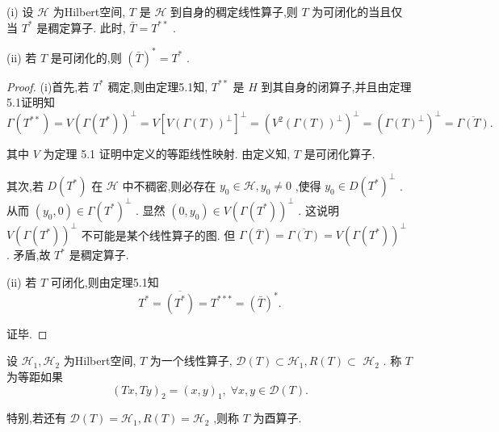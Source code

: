 \documentclass[lang=cn,newtx,10pt,scheme=chinese,thmcnt=chapter]{elegantbook}
\begin{document}
\begin{theorem}
     (i) 设 \(\mathcal{H}\) 为Hilbert空间, \(T\) 是 \(\mathcal{H}\) 到自身的稠定线性算子,则 \(T\) 为可闭化的当且仅当 \({T}^{ * }\) 是稠定算子. 此时, \(\bar{T} = {T}^{* * }\) .

(ii) 若 \(T\) 是可闭化的,则 \({\left( \bar{T}\right) }^{ * } = {T}^{ * }\) .

\end{theorem}
\begin{proof}
    (i)首先,若 \({T}^{ * }\) 稠定,则由定理5.1知, \({T}^{* * }\) 是 \(H\) 到其自身的闭算子,并且由定理5.1证明知
\begin{equation*}
\Gamma \left( {T}^{* * }\right)  = V{\left( \Gamma \left( {T}^{ * }\right) \right) }^{ \bot  } = V{\left\lbrack  V{\left( \Gamma \left( T\right) \right) }^{ \bot  }\right\rbrack  }^{ \bot  }
= {\left( {V}^{2}{\left( \Gamma \left( T\right) \right) }^{ \bot  }\right) }^{ \bot  } = {\left( \Gamma {\left( T\right) }^{ \bot  }\right) }^{ \bot  } = \overline{\Gamma \left( T\right) }.
\end{equation*}

其中 \(V\) 为定理 5.1 证明中定义的等距线性映射. 由定义知, \(T\) 是可闭化算子.

其次,若 \(D\left( {T}^{ * }\right)\) 在 \(\mathcal{H}\) 中不稠密,则必存在 \({y}_{0} \in  \mathcal{H},{y}_{0} \neq  0\) ,使得 \({y}_{0} \in  D{\left( {T}^{ * }\right) }^{ \bot  }\) . 从而 \(\left( {{y}_{0},0}\right)  \in  \Gamma {\left( {T}^{ * }\right) }^{ \bot  }\) . 显然 \(\left( {0,{y}_{0}}\right)  \in  V{\left( \Gamma \left( {T}^{ * }\right) \right) }^{ \bot  }\) . 这说明 \(V{\left( \Gamma \left( {T}^{ * }\right) \right) }^{ \bot  }\) 不可能是某个线性算子的图. 但 \(\Gamma \left( \bar{T}\right)  = \overline{\Gamma \left( T\right) } = V{\left( \Gamma \left( {T}^{ * }\right) \right) }^{ \bot  }\) . 矛盾,故 \({T}^{ * }\) 是稠定算子.

(ii) 若 \(T\) 可闭化,则由定理5.1知
\begin{equation*}
{T}^{ * } = \overline{\left( {T}^{ * }\right) } = {T}^{* *  * } = {\left( \bar{T}\right) }^{ * }.
\end{equation*}

证毕.

\end{proof}
\begin{definition}
    设 \({\mathcal{H}}_{1},{\mathcal{H}}_{2}\) 为Hilbert空间, \(T\) 为一个线性算子, \(\mathcal{D}(T)  \subset  {\mathcal{H}}_{1},R\left( T\right)  \subset\)  \({\mathcal{H}}_{2}\) . 称 \(T\) 为等距如果
\begin{equation*}
{\left( Tx,Ty\right) }_{2} = {\left( x,y\right) }_{1},\;\forall x,y \in  \mathcal{D}(T) .
\end{equation*}

特别,若还有 \(\mathcal{D}(T)  = {\mathcal{H}}_{1},R\left( T\right)  = {\mathcal{H}}_{2}\) ,则称 \(T\) 为酉算子.
\end{definition}
\end{document}

